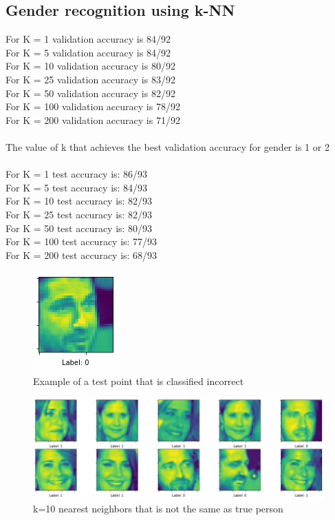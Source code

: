 \documentclass{article}
\begin{document}
\pagebreak
\subsection{Gender recognition using k-NN}
For K = 1 validation accuracy is 84/92\\
For K = 5 validation accuracy is 84/92\\
For K = 10 validation accuracy is 80/92\\
For K = 25 validation accuracy is 83/92\\
For K = 50 validation accuracy is 82/92\\
For K = 100 validation accuracy is 78/92\\
For K = 200  validation accuracy is 71/92\\\\
The value of k that achieves the best validation accuracy for gender is 1 or 2\\\\
For K = 1 test accuracy is: 86/93\\
For K = 5  test accuracy is: 84/93\\
For K = 10  test accuracy is: 82/93\\
For K = 25  test accuracy is: 82/93\\
For K = 50  test accuracy is: 80/93\\
For K = 100  test accuracy is: 77/93\\
For K = 200  test accuracy is: 68/93\\

\begin{figure}[h]
    \caption{Example of a test point that is classified incorrect}
    \centering
        \includegraphics[scale=0.6]{7.png}
\end{figure}

\begin{figure}[h]
    \caption{k=10 nearest neighbors that is not the same as true person}
    \centering
        \includegraphics[scale=0.6]{8.png}
\end{figure}
\end{document}
